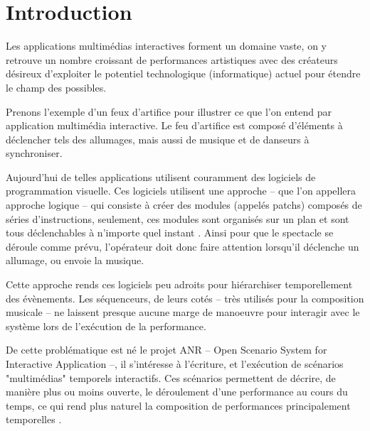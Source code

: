 \chapter*{Introduction}

Les applications multimédias interactives forment un domaine vaste, on y retrouve un nombre croissant de performances artistiques avec des créateurs désireux d'exploiter le potentiel technologique (informatique) actuel pour étendre le champ des possibles.

Prenons l'exemple d'un feux d'artifice pour illustrer ce que l'on entend par application multimédia interactive. Le feu d'artifice  est composé d'éléments à déclencher tels des allumages, mais aussi de musique et de danseurs à synchroniser.


Aujourd'hui de telles applications utilisent couramment des logiciels de programmation visuelle\cite{Cycling742015}\cite{Pure2015}.
Ces logiciels utilisent une approche -- que l'on appellera approche logique -- qui consiste à créer des modules (appelés patchs) composés de séries d'instructions, seulement, ces modules sont organisés sur un plan et sont tous déclenchables à n'importe quel instant . Ainsi pour que le spectacle se déroule comme prévu, l'opérateur doit donc faire attention lorsqu'il déclenche un allumage, ou envoie la musique.


Cette approche rends ces logiciels peu adroits pour hiérarchiser temporellement des évènements. Les séquenceurs, de leurs cotés -- très utilisés pour la composition musicale -- ne laissent presque aucune marge de manoeuvre pour interagir avec le système lors de l'exécution de la performance.

De cette problématique est né le projet ANR \ossia{} -- Open Scenario System for Interactive Application --, il s'intéresse à l'écriture, et l'exécution de scénarios "multimédias" temporels interactifs. Ces scénarios permettent de décrire, de manière plus ou moins ouverte, le déroulement d'une performance au cours du temps, ce qui rend plus naturel la composition de performances principalement temporelles .

